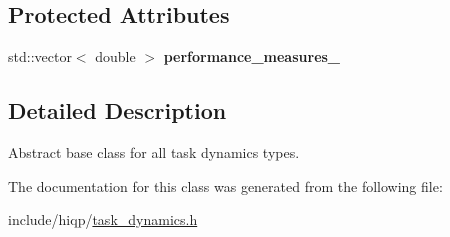 \subsection*{Protected Attributes}
\begin{DoxyCompactItemize}
\item 
\hypertarget{classhiqp_1_1TaskDynamics_acbef47a5ae066079eb530aa0d6b02569}{std\-::vector$<$ double $>$ {\bfseries performance\-\_\-measures\-\_\-}}\label{classhiqp_1_1TaskDynamics_acbef47a5ae066079eb530aa0d6b02569}

\end{DoxyCompactItemize}


\subsection{Detailed Description}
Abstract base class for all task dynamics types. 

The documentation for this class was generated from the following file\-:\begin{DoxyCompactItemize}
\item 
include/hiqp/\hyperlink{task__dynamics_8h}{task\-\_\-dynamics.\-h}\end{DoxyCompactItemize}
